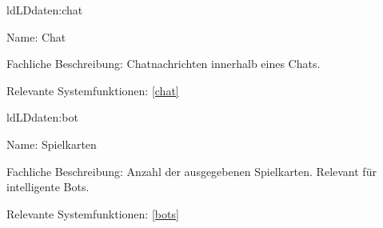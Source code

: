 \begin{description}[leftmargin=5em, style=sameline]
	\begin{lhp}{ld}{LD}{daten:chat}
	\item [Name:] Chat
	\item [Fachliche Beschreibung:] Chatnachrichten innerhalb eines Chats.
	\item [Relevante Systemfunktionen:] \ref{chat}
	\end{lhp}

	\begin{lhp}{ld}{LD}{daten:bot}
	\item [Name:] Spielkarten
	\item [Fachliche Beschreibung:] Anzahl der ausgegebenen Spielkarten. Relevant für intelligente Bots.
	\item [Relevante Systemfunktionen:] \ref{bots}
	\end{lhp}

\end{description}